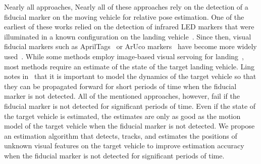 Nearly all approaches,
Nearly all of these approaches rely on the
detection of a fiducial marker on the moving vehicle for relative pose
estimation. One of the earliest of
these works relied on the detection of infrared LED markers that were
illuminated in a known configuration on the landing
vehicle~\cite{wenzel2011automatic}. Since then, visual fiducial markers such as
AprilTags~\cite{olson2011tags} or ArUco markers~\cite{garrido2016generation}
have become more widely
used~\cite{ling2014precision,borowczyk2017autonomous,marantos2018vision,
araar2017vision}.
While some methods employ image-based visual servoing for
landing~\cite{lee2012autonomous,wynn2019visual}, most methods
require an estimate of the state of the target landing vehicle.
Ling notes in~\cite{ling2014precision} that it is important to model the
dynamics of the target vehicle so that they can be propagated forward for short
periods of time when the fiducial marker is not
detected. All of the mentioned
approaches, however, fail if the fiducial marker is not detected for
significant periods of time.
Even if the state of the target vehicle is estimated, the estimates are only as
good as the
motion model of the target vehicle when the fiducial marker is not detected.
We propose an estimation algorithm that detects,
tracks, and estimates the positions of unknown visual features on the target vehicle to improve
estimation accuracy when the fiducial marker is not detected for significant
periods of time.


